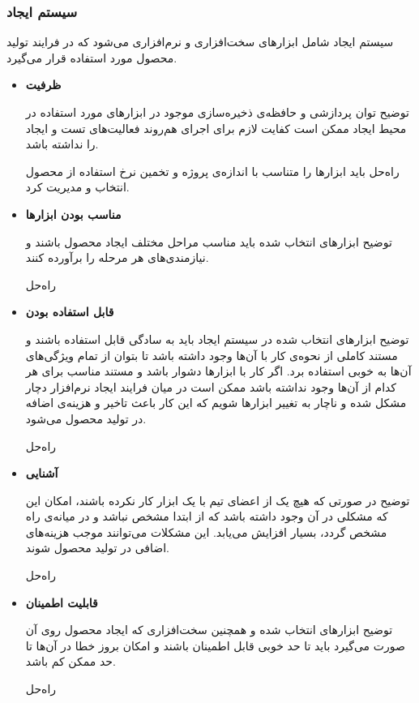 \subsubsection{سیستم ایجاد}

سیستم ایجاد شامل ابزارهای سخت‌افزاری و نرم‌افزاری می‌شود که در فرایند تولید محصول مورد استفاده قرار می‌گیرد.

\begin{itemize}
	
\item 
\textbf{ظرفیت}


توضیح \hspace*{1cm} 
توان پردازشی و حافظه‌ی ذخیره‌سازی موجود در ابزارهای مورد استفاده در محیط ایجاد ممکن است کفایت لازم برای اجرای هم‌روند فعالیت‌های تست و ایجاد را نداشته باشد.

راه‌حل \hspace*{1cm} 
باید ابزارها را متناسب با اندازه‌ی پروژه و تخمین نرخ استفاده از محصول انتخاب و مدیریت کرد.
	
\item 
\textbf{مناسب بودن ابزارها}


توضیح \hspace*{1cm} 
ابزارهای انتخاب شده باید مناسب مراحل مختلف ایجاد محصول باشند و نیازمندی‌های هر مرحله را برآورده کنند.

راه‌حل \hspace*{1cm} 

\item 
\textbf{قابل استفاده بودن}


توضیح \hspace*{1cm} 
ابزارهای انتخاب شده در سیستم ایجاد باید به سادگی قابل استفاده باشند و مستند کاملی از نحوه‌ی کار با آن‌ها وجود داشته باشد تا بتوان از تمام ویژگی‌های آن‌ها به خوبی استفاده برد. اگر کار با ابزارها دشوار باشد و مستند مناسب برای هر کدام از آن‌ها وجود نداشته باشد ممکن است در میان فرایند ایجاد نرم‌افزار دچار مشکل شده و ناچار به تغییر ابزارها شویم که این کار باعث تاخیر و هزینه‌ی اضافه در تولید محصول می‌شود.

راه‌حل \hspace*{1cm} 
\item 
\textbf{آشنایی}


توضیح \hspace*{1cm} 
در صورتی که هیچ یک از اعضای تیم با یک ابزار کار نکرده باشند، امکان این که مشکلی در آن وجود داشته باشد که از ابتدا مشخص نباشد و در میانه‌ی راه مشخص گردد، بسیار افزایش می‌یابد. این مشکلات می‌توانند موجب هزینه‌های اضافی در تولید محصول شوند.

راه‌حل \hspace*{1cm} 

\item 
\textbf{قابلیت اطمینان}

توضیح \hspace*{1cm} 
ابزارهای انتخاب شده و همچنین سخت‌افزاری که ایجاد محصول روی آن صورت می‌گیرد باید تا حد خوبی قابل اطمینان باشند و امکان بروز خطا در آن‌ها تا حد ممکن کم باشد. 

راه‌حل \hspace*{1cm} 

	
\end{itemize}

